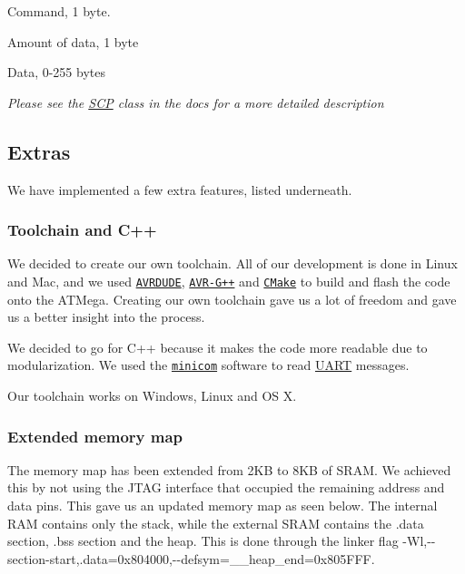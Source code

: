 \begin{DoxyItemize}
\item Command, 1 byte.
\item Amount of data, 1 byte
\item Data, 0-\/255 bytes
\end{DoxyItemize}

{\itshape Please see the \hyperlink{class_s_c_p}{S\+CP} class in the docs for a more detailed description}

\subsection*{Extras}

We have implemented a few extra features, listed underneath.

\subsubsection*{Toolchain and C++}

We decided to create our own toolchain. All of our development is done in Linux and Mac, and we used \href{http://www.nongnu.org/avrdude/}{\tt A\+V\+R\+D\+U\+DE}, \href{http://www.nongnu.org/avr-libc/}{\tt A\+V\+R-\/\+G++} and \href{https://cmake.org/}{\tt C\+Make} to build and flash the code onto the A\+T\+Mega. Creating our own toolchain gave us a lot of freedom and gave us a better insight into the process.

We decided to go for C++ because it makes the code more readable due to modularization. We used the \href{https://help.ubuntu.com/community/Minicom}{\tt minicom} software to read \hyperlink{class_u_a_r_t}{U\+A\+RT} messages.

Our toolchain works on Windows, Linux and OS X.

\subsubsection*{Extended memory map}

The memory map has been extended from 2\+KB to 8\+KB of S\+R\+AM. We achieved this by not using the J\+T\+AG interface that occupied the remaining address and data pins. This gave us an updated memory map as seen below. The internal R\+AM contains only the stack, while the external S\+R\+AM contains the .data section, .bss section and the heap. This is done through the linker flag {\ttfamily -\/\+Wl,-\/-\/section-\/start,.data=0x804000,-\/-\/defsym=\+\_\+\+\_\+heap\+\_\+end=0x805\+F\+FF}.




